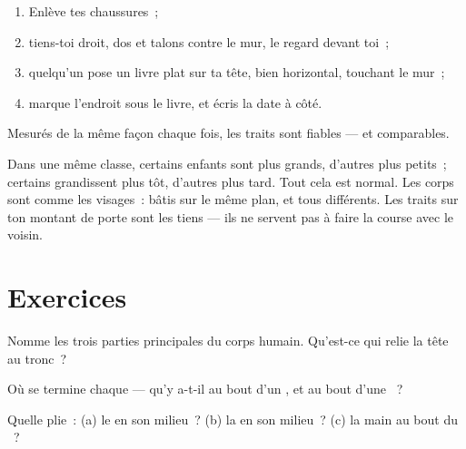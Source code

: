 \begin{method}\label{met:g1:my-body:measure}
\begin{enumerate}
  \item Enlève tes chaussures~;
  \item tiens-toi droit, dos et talons contre le mur, le regard
        devant toi~;
  \item quelqu'un pose un livre plat sur ta tête, bien horizontal,
        touchant le mur~;
  \item marque l'endroit sous le livre, et écris la date à côté.
\end{enumerate}
Mesurés de la même façon chaque fois, les traits sont fiables ---
et comparables.
\end{method}

\begin{remark}\label{rem:g1:my-body:different}
Dans une même classe, certains enfants sont plus grands, d'autres
plus petits~; certains grandissent plus tôt, d'autres plus tard.
Tout cela est normal. Les corps sont comme les visages~: bâtis sur
le même plan, et tous différents. Les traits sur ton montant de
porte sont les tiens --- ils ne servent pas à faire la course avec
le voisin.
\end{remark}

\section{Exercices}

\begin{exercise}[$\star$]\label{exo:g1:my-body:1}
Nomme les trois parties principales du corps humain. Qu'est-ce qui
relie la tête au tronc~?
\end{exercise}

\begin{exercise}[$\star$]\label{exo:g1:my-body:2}
Où se termine chaque  --- qu'y a-t-il au bout d'un , et au
bout d'une ~?
\end{exercise}

\begin{exercise}[$\star$]\label{exo:g1:my-body:3}
Quelle  plie~: (a) le  en son milieu~? (b) la 
en son milieu~? (c) la main au bout du ~?
\end{exercise}

